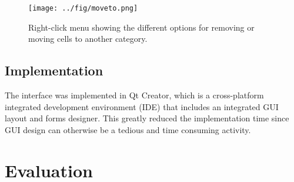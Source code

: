 \begin{figure}[h!]
    \centering
    \texttt{[image: ../fig/moveto.png]}
    \caption{Right-click menu showing the different options for removing or moving cells to another category.}
    \label{fig:gui_remove}
\end{figure}


\subsection{Implementation}
The interface was implemented in Qt Creator, which is a cross-platform integrated development environment (IDE) that includes an integrated GUI layout and forms designer. This greatly reduced the implementation time since GUI design can otherwise be a tedious and time consuming activity. 

\section{Evaluation}\label{sec:research:history}
